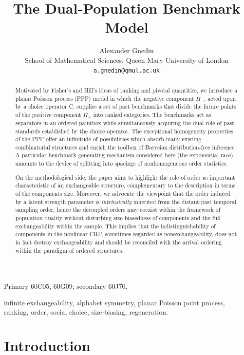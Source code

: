 \documentclass[11pt]{article}
\title{The Dual-Population Benchmark Model}
\author{Alexander Gnedin\\
\small School of Mathematical Sciences, Queen Mary University of London\\
\small \texttt{a.gnedin@qmul.ac.uk}}
\date{}
\theoremstyle{plain}
\theoremstyle{definition}
\begin{document}
\maketitle

\begin{abstract}
Motivated by Fisher's and Hill's \cite{Fisher,Hill} ideas of ranking and pivotal quantities,
we introduce a  planar Poisson process (PPP) model in which the negative component \(\Pi_-\), acted upon by a choice operator {\rm C}, supplies a set of past benchmarks that divide the future points of the positive component \(\Pi_+\) into ranked categories. The benchmarks act as separators in an ordered paintbox while simultaneously acquiring the dual role of past standards established by the choice operator. The exceptional homogeneity properties of the PPP offer an infinitude of possibilities which absorb  many existing combinatorial structures
and enrich the toolbox of Bayesian distribution-free inference. A particular benchmark
generating mechanism considered here (the exponential race) amounts to the
 device of splitting into spacings of  nonhomogeneous order statistics.

On the methodological side,  the paper aims to highlight the role of order  as important characteristic of an exchangeable structure, complementary to the description in terms
of the components size. Moreover, we  advocate the viewpoint  that the order induced by a latent strength parameter is {\it intrinsically} inherited
from the distant-past temporal sampling  order, hence  the decoupled orders may  coexist within the framework of population duality without disturbing
size-biasedness of components and the full exchangeability within the sample.
This implies that the indistinguishability of components in the nonlinear CRP, sometimes regarded as nonexchangeability, does not in fact destroy exchangeability
and should be reconciled with the arrival ordering within the paradigm of  ordered structures.
\end{abstract}

 Primary 60C05, 60G09; secondary 60J70.

 infinite exchangeability, alphabet symmetry, planar Poisson point process, ranking, order, social choice, size-biasing, regeneration.

\section{Introduction}
\label{sec:intro}
\end{document}

